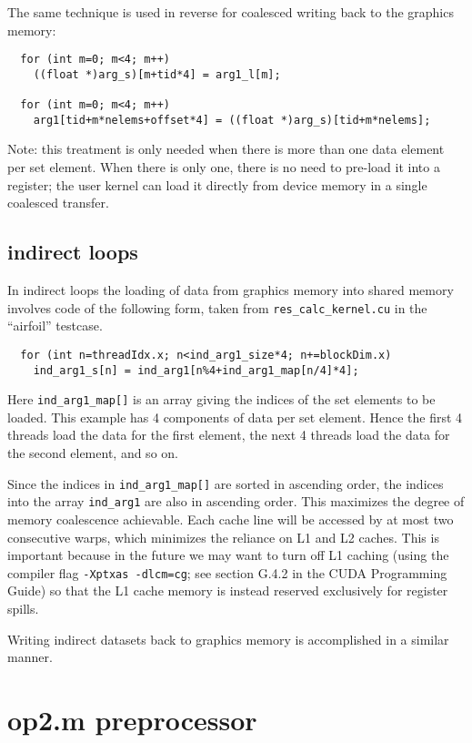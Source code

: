 \documentclass[12pt]{article}
\begin{document}
The same technique is used in reverse for coalesced writing back to the
graphics memory:
\begin{verbatim}
  for (int m=0; m<4; m++)
    ((float *)arg_s)[m+tid*4] = arg1_l[m];

  for (int m=0; m<4; m++)
    arg1[tid+m*nelems+offset*4] = ((float *)arg_s)[tid+m*nelems];
\end{verbatim}

Note: this treatment is only needed when there is more than one data element
per set element.  When there is only one, there is no need to pre-load it into
a register; the user kernel can load it directly from device memory in a
single coalesced transfer.

\newpage
\subsection{indirect loops}

In indirect loops the loading of data from graphics memory into shared
memory involves code of the following form, taken from
{\tt res\_calc\_kernel.cu} in the ``airfoil'' testcase.
\begin{verbatim}
  for (int n=threadIdx.x; n<ind_arg1_size*4; n+=blockDim.x)
    ind_arg1_s[n] = ind_arg1[n%4+ind_arg1_map[n/4]*4];
\end{verbatim}
Here \verb!ind_arg1_map[]! is an array giving the indices of the set
elements to be loaded.  This example has 4 components of data per set
element.  Hence the first 4 threads load the data for the first element,
the next 4 threads load the data for the second element, and so on.

Since the indices in \verb!ind_arg1_map[]! are sorted in ascending order,
the indices into the array \verb!ind_arg1! are also in ascending order.
This maximizes the degree of memory coalescence achievable. Each cache line
will be accessed by at most two consecutive warps, which minimizes the
reliance on L1 and L2 caches. This is important because in the future we
may want to turn off L1 caching (using the compiler flag {\tt -Xptxas -dlcm=cg};
see section G.4.2 in the CUDA Programming Guide) so that the L1 cache
memory is instead reserved exclusively for register spills.

Writing indirect datasets back to graphics memory is accomplished in a
similar manner.

\newpage

\section{op2.m preprocessor}
\end{document}
